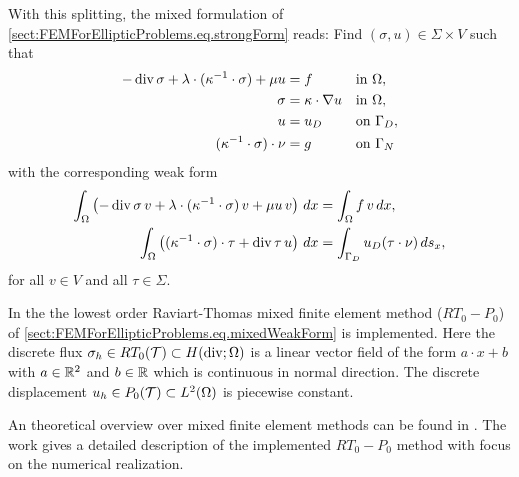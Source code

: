 \smallskip

\noindent With this splitting, the mixed formulation of \eqref{sect:FEMForEllipticProblems.eq.strongForm} reads: Find $(\sigma,u)\in\Sigma\times V$ such that
\begin{align}\label{sect:FEMForEllipticProblems.eq.mixedStrongForm}
  -\operatorname{div}\sigma + \lambda\cdot(\kappa^{-1}\cdot\sigma) + \mu u &= f &&\text{in } \Omega, \nonumber\\
  \sigma &= \kappa\cdot\nabla u &&\text{in } \Omega,\\
  u &= u_D &&\text{on } \Gamma_D, \nonumber\\
  (\kappa^{-1}\cdot\sigma)\cdot\nu &= g &&\text{on } \Gamma_N\nonumber
\end{align}
with the corresponding weak form
\begin{align}\label{sect:FEMForEllipticProblems.eq.mixedWeakForm}
  \int_\Omega \left( -\operatorname{div}\sigma\,v + \lambda\cdot(\kappa^{-1}\cdot\sigma)\,v + \mu u\,v\right)\,dx &= \int_\Omega f\,v\,dx, \\
  \int_\Omega \left((\kappa^{-1}\cdot\sigma)\cdot\tau + \operatorname{div}\tau\, u\right)\,dx &= \int_{\Gamma_D} u_D(\tau\cdot\nu)\,ds_x,\nonumber
\end{align}
for all $v\in V$ and all $\tau\in\Sigma$.

\bigskip

\noindent In the \FFW the lowest order Raviart-Thomas mixed finite element method ($RT_0-P_0$) of \eqref{sect:FEMForEllipticProblems.eq.mixedWeakForm} is implemented. Here the discrete flux $\sigma_h\in RT_0(\mathcal{T})\subset H(\operatorname{div};\Omega)$ is a linear vector field of the form $a\cdot x+b$ with $a\in\mathbb{R}^2$ and $b\in\mathbb{R}$ which is continuous in normal direction. The discrete displacement $u_h\in P_0(\mathcal{T})\subset L^2(\Omega)$ is piecewise constant. 

\medskip

\noindent An theoretical overview over mixed finite element methods can be found in \cite{Ar,Bra}. The work \cite{BahCC} gives a detailed description of the implemented $RT_0-P_0$ method with focus on the numerical realization.